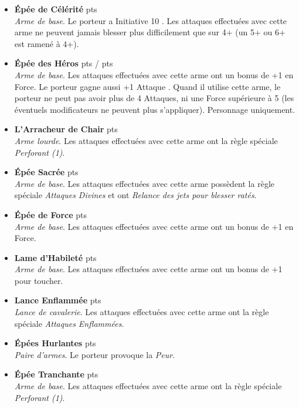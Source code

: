 \begin{multicols}{2}
\begin{itemize}[label={-}]
\item \textbf{Épée de Célérité}  {pts} \\
\textit{Arme de base}. Le porteur a Initiative 10 . Les attaques effectuées avec cette arme ne peuvent jamais blesser plus difficilement que sur 4+ (un 5+ ou 6+ est ramené à 4+).

\item \textbf{Épée des Héros} \dotfill {} {pts} /  {pts} \\
\textit{Arme de base}. Les attaques effectuées avec cette arme ont un bonus de +1 en Force. Le porteur gagne aussi +1 Attaque . Quand il utilise cette arme, le porteur ne peut pas avoir plus de 4 Attaques, ni une Force supérieure à 5 (les éventuels modificateurs ne peuvent plus s'appliquer). Personnage uniquement.

\item \textbf{L'Arracheur de Chair}  {pts} \\
\textit{Arme lourde}. Les attaques effectuées avec cette arme ont la règle spéciale \emph{Perforant (1)}.

\item \textbf{Épée Sacrée}  {pts} \\
\textit{Arme de base}. Les attaques effectuées avec cette arme possèdent la règle spéciale \emph{Attaques Divines} et ont \emph{Relance des jets pour blesser ratés}.

\item \textbf{Épée de Force}  {pts} \\
\textit{Arme de base}. Les attaques effectuées avec cette arme ont un bonus de +1 en Force.

\item \textbf{Lame d'Habileté}  {pts} \\
\textit{Arme de base}. Les attaques effectuées avec cette arme ont un bonus de +1 pour toucher.

\item \textbf{Lance Enflammée}  {pts} \\
\textit{Lance de cavalerie}. Les attaques effectuées avec cette arme ont la règle spéciale \emph{Attaques Enflammées}.

\item \textbf{Épées Hurlantes}  {pts} \\
\textit{Paire d'armes}. Le porteur provoque la \emph{Peur}.

\item \textbf{Épée Tranchante}  {pts} \\
\textit{Arme de base}. Les attaques effectuées avec cette arme ont la règle spéciale \emph{Perforant (1)}.

\end{itemize}
\end{multicols}

